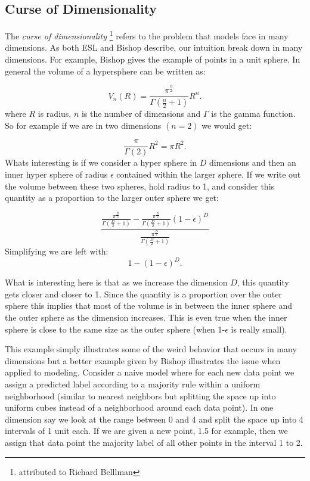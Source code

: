 \subsection{Curse of Dimensionality} \label{sec:curse}

The \emph{curse of dimensionality}  \footnote{attributed to Richard Belllman} refers to the problem that models face in many dimensions. As both ESL and Bishop describe, our intuition break down in many dimensions. For example, Bishop gives the example of points in a unit sphere. In general the volume of a hypersphere can be written as:

\begin{equation}
V_n(R) = \frac{\pi^{\frac{n}{2}}}{\Gamma(\frac{n}{2} + 1)}R^n.
\end{equation}
where $R$ is radius, $n$ is the number of dimensions and $\Gamma$ is the \gls{gamma} function. So for example if we are in two dimensions $(n=2)$ we would get:

\begin{equation}
\frac{\pi}{\Gamma(2)}R^2 = \pi R^2.
\end{equation}
Whats interesting is if we consider a hyper sphere in $D$ dimensions and then an inner hyper sphere of radius $\epsilon$ contained within the larger sphere. If we write out the volume between these two spheres, hold radius to 1, and consider this quantity as a proportion to the larger outer sphere we get:

\begin{equation}
\frac{\frac{\pi^{\frac{D}{2}}}{\Gamma(\frac{D}{2} + 1)} - \frac{\pi^{\frac{D}{2}}}{\Gamma(\frac{D}{2} + 1)} (1-\epsilon)^{D}}{\frac{\pi^{\frac{D}{2}}}{\Gamma(\frac{D}{2} + 1)}}
\end{equation}
Simplifying we are left with:
\begin{equation}
1 - (1-\epsilon)^D.
\end{equation}

What is interesting here is that as we increase the dimension $D$, this quantity gets closer and closer to 1. Since the quantity is a proportion over the outer sphere this implies that most of the volume is in between the inner sphere and the outer sphere as the dimension increases. This is even true when the inner sphere is close to the same size as the outer sphere (when 1-$\epsilon$ is really small).

This example simply illustrates some of the weird behavior that occurs in many dimensions but a better example given by Bishop illustrates the issue when applied to modeling. Consider a naive model where for each new data point we assign a predicted label according to a majority rule within a uniform neighborhood (similar to nearest neighbors but splitting the space up into uniform cubes instead of a neighborhood around each data point). In one dimension say we look at the range between 0 and 4 and split the space up into 4 intervals of 1 unit each. If we are given a new point, 1.5 for example, then we assign that data point the majority label of all other points in the interval 1 to 2. 

